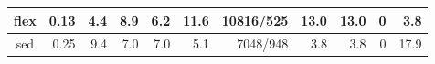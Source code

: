 \begin{table*}[htbp]
{\begin{tabular}{|c|r|r|r|r|r|r|r|r|r|r|}
flex                     & 0.13                                                                                                & 4.4      & 8.9      & 6.2      & 11.6    & 10816/525                                                                                                        & 13.0       & 13.0       & 0          & 3.8        \\ \hline
sed                      & 0.25                                                                                                & 9.4      & 7.0      & 7.0      & 5.1     & 7048/948                                                                                                         & 3.8        & 3.8        & 0          & 17.9       \\ \hline
\end{tabular}
}
\end{table*}

